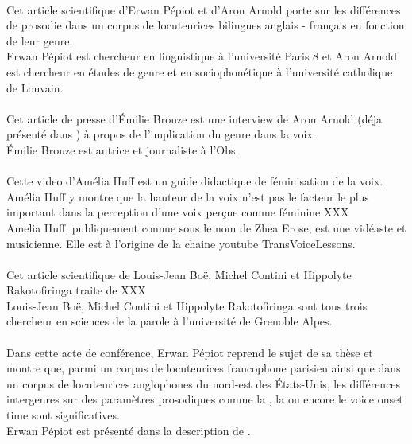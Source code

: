 \cite{Pep20} \\
      Cet article scientifique d'Erwan Pépiot et d'Aron Arnold porte sur les différences de prosodie dans un corpus de locuteurices bilingues anglais - français en fonction de leur genre.\\
      Erwan Pépiot est chercheur en linguistique à l'université Paris 8 et Aron Arnold est chercheur en études de genre et en sociophonétique à l'université catholique de Louvain.\\

\cite{Bro18} \\
      Cet article de presse d'Émilie Brouze est une interview de Aron Arnold (déja présenté dans \cite{Pep20}) à propos de l'implication du genre dans la voix.\\
      Émilie Brouze est autrice et journaliste à l'Obs.\\


\cite{video} \\
      Cette video d'Amélia Huff est un guide didactique de féminisation de la voix. Amélia Huff y montre que la hauteur de la voix n'est pas le facteur le plus important dans la perception d'une voix perçue comme féminine XXX\\
      Amelia Huff, publiquement connue sous le nom de Zhea Erose, est une vidéaste et musicienne. Elle est à l'origine de la chaine youtube TransVoiceLessons.\\

\cite{Boe75} \\
      Cet article scientifique de Louis-Jean Boë, Michel Contini et Hippolyte Rakotofiringa traite de XXX\\
      Louis-Jean Boë, Michel Contini et Hippolyte Rakotofiringa sont tous trois chercheur en sciences de la parole à l'université de Grenoble Alpes.\\

\cite{Pep16} \\
      Dans cette acte de conférence, Erwan Pépiot reprend le sujet de sa thèse et montre que, parmi un corpus de locuteurices francophone parisien ainsi que dans un corpus de locuteurices anglophones du nord-est des États-Unis, les différences intergenres sur des paramètres prosodiques comme la , la  ou encore le voice onset time sont significatives.\\
      Erwan Pépiot est présenté dans la description de \cite{Pep20}.\\

